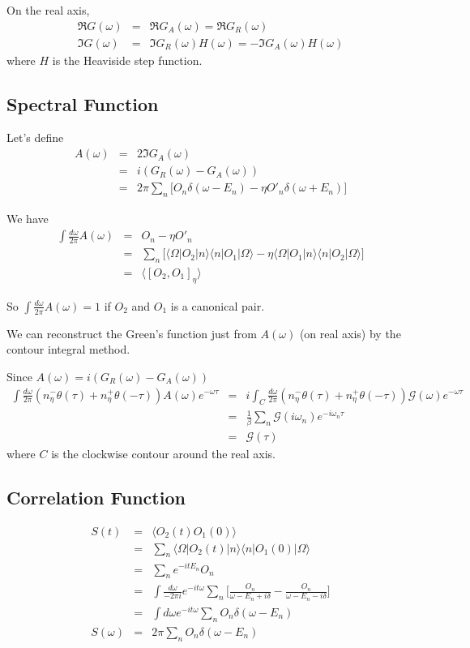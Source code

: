 \documentclass[12pt]{book}
\begin{document}
	On the real axis,
	\begin{eqnarray}
		\Re G(\omega)&=&\Re G_A(\omega)=\Re G_R(\omega)\\
		\Im G(\omega)&=&\Im G_R(\omega)H(\omega)=-\Im G_A(\omega)H(\omega)
	\end{eqnarray}
	where $H$ is the Heaviside step function.
	\subsection{Spectral Function}
	
	Let's define
	\begin{eqnarray}
		A(\omega)&=&2\Im G_A(\omega)\\
		&=&i(G_R(\omega)-G_A(\omega))\\
		&=&2\pi\sum_{n}\big[O_n\delta(\omega-E_n)-\eta O'_n\delta(\omega+E_n)\big]
	\end{eqnarray}
	
	We have
	\begin{eqnarray}
		\int \frac{d\omega}{2\pi} A(\omega)&=&O_n-\eta O'_n\\
		&=&\sum_n\big[\langle\Omega|O_2|n\rangle\langle n|O_1|\Omega\rangle-\eta\langle\Omega|O_1|n\rangle\langle n|O_2|\Omega\rangle\big]\\
		&=&\langle [O_2,O_1]_\eta\rangle
	\end{eqnarray}
	
	So $\int \frac{d\omega}{2\pi} A(\omega)=1$ if $O_2$ and $O_1$ is a canonical pair.
	
	We can reconstruct the Green's function just from $A(\omega)$ (on real axis) by the contour integral method.
	
	Since $A(\omega)=i(G_R(\omega)-G_A(\omega))$
	\begin{eqnarray}
		\int \frac{d\omega}{2\pi}(n_\eta^-\theta(\tau)+n_\eta^+\theta(-\tau)) A(\omega)e^{-\omega \tau}&=&i\int_C \frac{d\omega}{2\pi}(n_\eta^-\theta(\tau)+n_\eta^+\theta(-\tau)) \mathcal G(\omega)e^{-\omega \tau}\\
		&=&\frac 1\beta\sum_n\mathcal G(i\omega_n)e^{-i\omega_n \tau}\\
		&=&\mathcal G(\tau)
	\end{eqnarray}
	where $C$ is the clockwise contour around the real axis.
	
	\subsection{Correlation Function}
	
	\begin{eqnarray}
		S(t)&=&\langle O_2(t) O_1(0)\rangle\\
		&=&\sum_n\langle \Omega|O_2(t)|n\rangle\langle n|O_1(0)|\Omega\rangle\\
		&=&\sum_ne^{-it E_n}O_n\\
		&=&\int\frac{d\omega}{-2\pi i}e^{-it\omega}\sum_{n}\Big[\frac{O_n}{\omega-E_n+i\delta}-\frac{O_n}{\omega-E_n-i\delta}\Big]\\
		&=&\int d\omega e^{-it\omega}\sum_{n}O_n\delta(\omega-E_n)\\
		S(\omega)&=&2\pi\sum_{n}O_n\delta(\omega-E_n)\\
	\end{eqnarray}
	
\end{document}
